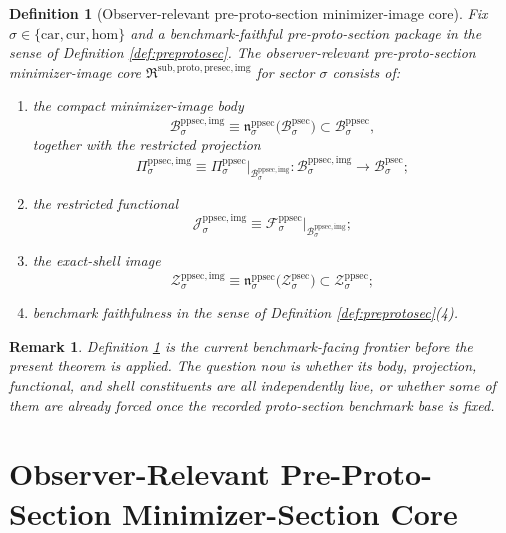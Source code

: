 \documentclass[11pt]{article}
\newcommand{\Car}{\mathrm{car}}
\newcommand{\Cur}{\mathrm{cur}}
\newcommand{\Hom}{\mathrm{hom}}
\newcommand{\ProtoSectionBody}[1]{\mathcal B_{#1}^{\mathrm{psec}}}
\newcommand{\ProtoSectionShell}[1]{\mathcal Z_{#1}^{\mathrm{psec}}}
\newcommand{\PreProtoSectionBody}[1]{\mathcal B_{#1}^{\mathrm{ppsec}}}
\newcommand{\PreProtoSectionProj}[1]{\Pi_{#1}^{\mathrm{ppsec}}}
\newcommand{\PreProtoSectionProtoMin}[1]{\mathfrak n_{#1}^{\mathrm{ppsec}}}
\newcommand{\PreProtoSectionFunctional}[1]{\mathscr F_{#1}^{\mathrm{ppsec}}}
\newcommand{\PreProtoSectionShell}[1]{\mathcal Z_{#1}^{\mathrm{ppsec}}}
\newcommand{\PreProtoSectionImageCore}{\mathfrak R^{\mathrm{sub,proto,presec,img}}}
\newcommand{\PreProtoSectionImgBody}[1]{\mathcal B_{#1}^{\mathrm{ppsec,img}}}
\newcommand{\PreProtoSectionImgProj}[1]{\Pi_{#1}^{\mathrm{ppsec,img}}}
\newcommand{\PreProtoSectionImgFunctional}[1]{\mathscr J_{#1}^{\mathrm{ppsec,img}}}
\newcommand{\PreProtoSectionImgShell}[1]{\mathcal Z_{#1}^{\mathrm{ppsec,img}}}
\newtheorem{definition}{Definition}
\newtheorem{remark}{Remark}
\begin{document}
\begin{definition}[Observer-relevant pre-proto-section minimizer-image core]
\label{def:imagecore}
Fix \(\sigma\in\{\Car,\Cur,\Hom\}\) and a benchmark-faithful pre-proto-section package in the sense of Definition \ref{def:preprotosec}. The \emph{observer-relevant pre-proto-section minimizer-image core} \(\PreProtoSectionImageCore\) for sector \(\sigma\) consists of:
\begin{enumerate}
    \item the compact minimizer-image body
    \[
    \PreProtoSectionImgBody{\sigma}
    \equiv
    \PreProtoSectionProtoMin{\sigma}\bigl(\ProtoSectionBody{\sigma}\bigr)
    \subset
    \PreProtoSectionBody{\sigma},
    \]
    together with the restricted projection
    \[
    \PreProtoSectionImgProj{\sigma}
    \equiv
    \PreProtoSectionProj{\sigma}\big|_{\PreProtoSectionImgBody{\sigma}}
    :
    \PreProtoSectionImgBody{\sigma}\to\ProtoSectionBody{\sigma};
    \]
    \item the restricted functional
    \[
    \PreProtoSectionImgFunctional{\sigma}
    \equiv
    \PreProtoSectionFunctional{\sigma}\big|_{\PreProtoSectionImgBody{\sigma}};
    \]
    \item the exact-shell image
    \[
    \PreProtoSectionImgShell{\sigma}
    \equiv
    \PreProtoSectionProtoMin{\sigma}\bigl(\ProtoSectionShell{\sigma}\bigr)
    \subset
    \PreProtoSectionShell{\sigma};
    \]
    \item benchmark faithfulness in the sense of Definition \ref{def:preprotosec}(4).
\end{enumerate}
\end{definition}

\begin{remark}
Definition \ref{def:imagecore} is the current benchmark-facing frontier before the present theorem is applied. The question now is whether its body, projection, functional, and shell constituents are all independently live, or whether some of them are already forced once the recorded proto-section benchmark base is fixed.
\end{remark}

\section{Observer-Relevant Pre-Proto-Section Minimizer-Section Core}
\end{document}
